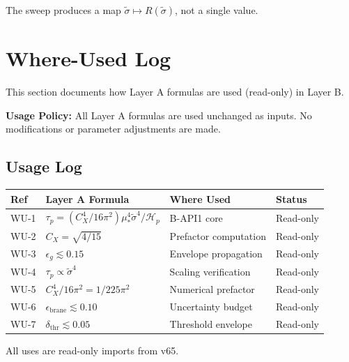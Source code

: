\documentclass[11pt,a4paper]{article}
\theoremstyle{definition}
\begin{document}
The sweep produces a map $\tilde{\sigma} \mapsto R(\tilde{\sigma})$, not a single value.

\section{Where-Used Log}
\label{sec:where-used}

\begin{whereuserbox}
This section documents how Layer A formulas are used (read-only) in Layer B.

\textbf{Usage Policy:} All Layer A formulas are used unchanged as inputs.
No modifications or parameter adjustments are made.
\end{whereuserbox}

\subsection{Usage Log}
\label{subsec:usage-log}

\begin{center}
\begin{longtable}{llll}
\toprule
Ref & Layer A Formula & Where Used & Status \\
\midrule
\endhead
WU-1 & $\tau_p = (C_X^4/16\pi^2) \mu_*^4 \tilde{\sigma}^4 / \mathcal{H}_p$ & B-API1 core & Read-only \\
WU-2 & $C_X = \sqrt{4/15}$ & Prefactor computation & Read-only \\
WU-3 & $\epsilon_g \lesssim 0.15$ & Envelope propagation & Read-only \\
WU-4 & $\tau_p \propto \tilde{\sigma}^4$ & Scaling verification & Read-only \\
WU-5 & $C_X^4/16\pi^2 = 1/225\pi^2$ & Numerical prefactor & Read-only \\
WU-6 & $\epsilon_{\text{brane}} \lesssim 0.10$ & Uncertainty budget & Read-only \\
WU-7 & $\delta_{\text{thr}} \lesssim 0.05$ & Threshold envelope & Read-only \\
\bottomrule
\end{longtable}
\end{center}

All uses are read-only imports from v65.

\end{document}
